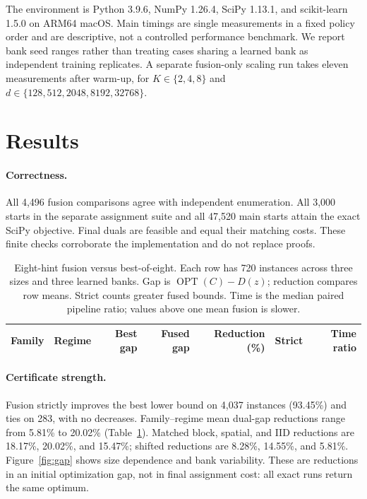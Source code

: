 \documentclass[10pt,letterpaper]{article}
\newcommand{\opt}{\operatorname{OPT}}
\begin{document}
The environment is Python 3.9.6, NumPy 1.26.4, SciPy 1.13.1, and scikit-learn 1.5.0 on ARM64 macOS. Main timings are single measurements in a fixed policy order and are descriptive, not a controlled performance benchmark. We report bank seed ranges rather than treating cases sharing a learned bank as independent training replicates. A separate fusion-only scaling run takes eleven measurements after warm-up, for $K\in\{2,4,8\}$ and $d\in\{128,512,2048,8192,32768\}$.

\section{Results}
\paragraph{Correctness.}
All 4,496 fusion comparisons agree with independent enumeration. All 3,000 starts in the separate assignment suite and all 47,520 main starts attain the exact SciPy objective. Final duals are feasible and equal their matching costs. These finite checks corroborate the implementation and do not replace proofs.

\begin{table}[t]
\centering\small
\caption{Eight-hint fusion versus best-of-eight. Each row has 720 instances across three sizes and three learned banks. Gap is $\opt(C)-D(z)$; reduction compares row means. Strict counts greater fused bounds. Time is the median paired pipeline ratio; values above one mean fusion is slower.}
\label{tab:main}
\begin{tabular}{llrrrrr}\toprule
Family & Regime & Best gap & Fused gap & Reduction (\%) & Strict & Time ratio\\\midrule

\end{tabular}
\end{table}

\paragraph{Certificate strength.}
Fusion strictly improves the best lower bound on 4,037 instances (93.45\%) and ties on 283, with no decreases. Family--regime mean dual-gap reductions range from 5.81\% to 20.02\% (Table~\ref{tab:main}). Matched block, spatial, and IID reductions are 18.17\%, 20.02\%, and 15.47\%; shifted reductions are 8.28\%, 14.55\%, and 5.81\%. Figure~\ref{fig:gap} shows size dependence and bank variability. These are reductions in an initial optimization gap, not in final assignment cost: all exact runs return the same optimum.
\end{document}
